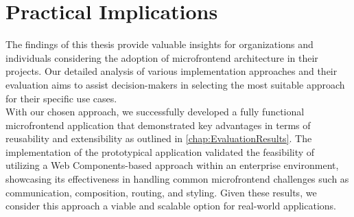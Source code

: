 \section{Practical Implications}
The findings of this thesis provide valuable insights for organizations and individuals considering the adoption of microfrontend architecture in their projects. Our detailed analysis of various implementation approaches and their evaluation aims to assist decision-makers in selecting the most suitable approach for their specific use cases. \\

\noindent
With our chosen approach, we successfully developed a fully functional microfrontend application that demonstrated key advantages in terms of reusability and extensibility as outlined in \ref{chap:EvaluationResults}. The implementation of the prototypical application validated the feasibility of utilizing a Web Components-based approach within an enterprise environment, showcasing its effectiveness in handling common microfrontend challenges such as communication, composition, routing, and styling. Given these results, we consider this approach a viable and scalable option for real-world applications.